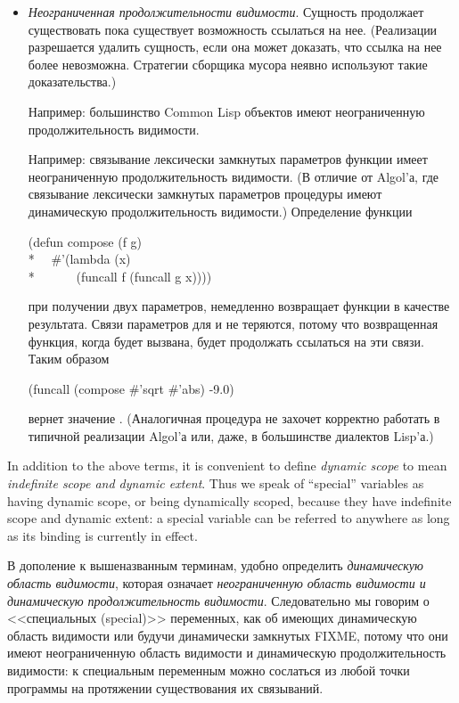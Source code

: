 \begin{itemize}
\item
\emph{Неограниченная продолжительности видимости}. Сущность продолжает существовать
пока существует возможность ссылаться на нее. (Реализации разрешается удалить
сущность, если она может доказать, что ссылка на нее более невозможна. Стратегии
сборщика мусора неявно используют такие доказательства.)

Например: большинство Common Lisp объектов имеют неограниченную продолжительность
видимости.

Например: связывание лексически замкнутых параметров функции имеет неограниченную
продолжительность видимости. (В отличие от Algol'а, где связывание лексически
замкнутых параметров процедуры имеют динамическую продолжительность видимости.)
Определение функции
\begin{lisp}
(defun compose (f g) \\*
~~\#'(lambda (x) \\*
~~~~~~(funcall f (funcall g x))))
\end{lisp}
при получении двух параметров, немедленно возвращает функции в качестве
результата.
Связи параметров для  и  не теряются, потому что возвращенная
функция, когда будет вызвана, будет продолжать ссылаться на эти связи.
Таким образом
\begin{lisp}
(funcall (compose \#'sqrt \#'abs) -9.0)
\end{lisp}
вернет значение . (Аналогичная процедура не захочет корректно работать в
типичной реализации Algol'а или, даже, в большинстве диалектов Lisp'а.)
\end{itemize}

In addition to the above terms, it is convenient to define \emph{dynamic scope}
to mean \emph{indefinite scope and dynamic extent}.  Thus we speak of
``special'' variables as having dynamic scope, or being dynamically scoped,
because they have indefinite scope and dynamic extent: a special variable
can be referred to anywhere as long as its binding is currently
in effect.

В дополение к вышеназванным терминам, удобно определить \emph{динамическую
  область видимости}, которая означает \emph{неограниченную область видимости и
  динамическую продолжительность видимости}. Следовательно мы говорим о
<<специальных (special)>> переменных, как об имеющих динамическую область
видимости или будучи динамически замкнутых FIXME, потому что они имеют
неограниченную область видимости и динамическую продолжительность видимости:
к специальным переменным можно сослаться из любой точки программы на протяжении
существования их связываний.

